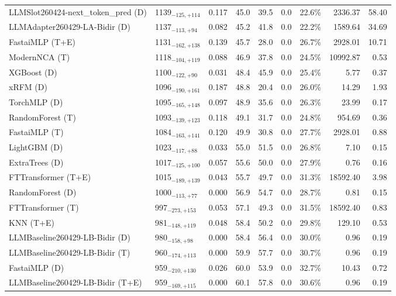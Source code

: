 \begin{tabular}{llcccccrr}
LLMSlot260424-next_token_pred (D) & 1139${}_{-125,+114}$ & 0.117 & 45.0 & 39.5 & 0.0 & 22.6\% & 2336.37 & 58.40 \\
LLMAdapter260429-LA-Bidir (D) & 1137${}_{-113,+94}$ & 0.082 & 45.2 & 41.8 & 0.0 & 22.2\% & 1589.64 & 34.69 \\
FastaiMLP (T+E) & 1131${}_{-162,+138}$ & 0.139 & 45.7 & 28.0 & 0.0 & 26.7\% & 2928.01 & 10.71 \\
ModernNCA (T) & 1118${}_{-104,+119}$ & 0.088 & 46.9 & 37.8 & 0.0 & 24.5\% & 10992.87 & 0.53 \\
XGBoost (D) & 1100${}_{-122,+90}$ & 0.031 & 48.4 & 45.9 & 0.0 & 25.4\% & 5.77 & 0.37 \\
xRFM (D) & 1096${}_{-190,+161}$ & 0.187 & 48.8 & 20.4 & 0.0 & 26.0\% & 14.29 & 1.93 \\
TorchMLP (D) & 1095${}_{-165,+148}$ & 0.097 & 48.9 & 35.6 & 0.0 & 26.3\% & 23.99 & 0.17 \\
RandomForest (T) & 1093${}_{-139,+123}$ & 0.118 & 49.1 & 31.7 & 0.0 & 24.8\% & 954.69 & 0.36 \\
FastaiMLP (T) & 1084${}_{-163,+141}$ & 0.120 & 49.9 & 30.8 & 0.0 & 27.7\% & 2928.01 & 0.88 \\
LightGBM (D) & 1023${}_{-117,+88}$ & 0.033 & 55.0 & 51.5 & 0.0 & 26.8\% & 7.10 & 0.15 \\
ExtraTrees (D) & 1017${}_{-125,+100}$ & 0.057 & 55.6 & 50.0 & 0.0 & 27.9\% & 0.76 & 0.16 \\
FTTransformer (T+E) & 1015${}_{-189,+139}$ & 0.043 & 55.7 & 49.7 & 0.0 & 31.3\% & 18592.40 & 3.98 \\
RandomForest (D) & 1000${}_{-113,+77}$ & 0.000 & 56.9 & 54.7 & 0.0 & 28.7\% & 0.81 & 0.15 \\
FTTransformer (T) & 997${}_{-273,+153}$ & 0.053 & 57.1 & 49.3 & 0.0 & 31.5\% & 18592.40 & 0.83 \\
KNN (T+E) & 981${}_{-148,+119}$ & 0.048 & 58.4 & 50.2 & 0.0 & 29.8\% & 129.10 & 0.53 \\
LLMBaseline260429-LB-Bidir (D) & 980${}_{-158,+98}$ & 0.000 & 58.4 & 56.4 & 0.0 & 30.0\% & 0.96 & 0.19 \\
LLMBaseline260429-LB-Bidir (T) & 960${}_{-174,+113}$ & 0.000 & 59.9 & 57.7 & 0.0 & 30.7\% & 0.96 & 0.19 \\
FastaiMLP (D) & 959${}_{-210,+130}$ & 0.026 & 60.0 & 53.9 & 0.0 & 32.7\% & 10.43 & 0.72 \\
LLMBaseline260429-LB-Bidir (T+E) & 959${}_{-169,+115}$ & 0.000 & 60.1 & 57.8 & 0.0 & 30.6\% & 0.96 & 0.19 \\

\end{tabular}
